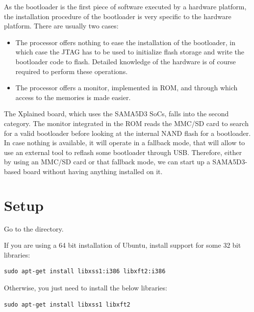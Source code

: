 
As the bootloader is the first piece of software executed by a
hardware platform, the installation procedure of the bootloader is
very specific to the hardware platform. There are usually two cases:

\begin{itemize}

\item The processor offers nothing to ease the installation of the
  bootloader, in which case the JTAG has to be used to initialize
  flash storage and write the bootloader code to flash. Detailed
  knowledge of the hardware is of course required to perform these
  operations.

\item The processor offers a monitor, implemented in ROM, and through
  which access to the memories is made easier.

\end{itemize}

The Xplained board, which uses the SAMA5D3 SoCs, falls into the second
category. The monitor integrated in the ROM reads the MMC/SD card to
search for a valid bootloader before looking at the internal NAND
flash for a bootloader. In case nothing is available, it will operate
in a fallback mode, that will allow to use an external tool
to reflash some bootloader through USB. Therefore, either by using an MMC/SD
card or that fallback mode, we can start up a SAMA5D3-based board
without having anything installed on it.

\section{Setup}

Go to the  directory.

If you are using a 64 bit installation of Ubuntu, install support for
some 32 bit libraries:

\begin{verbatim}
sudo apt-get install libxss1:i386 libxft2:i386
\end{verbatim}

Otherwise, you just need to install the below libraries:

\begin{verbatim}
sudo apt-get install libxss1 libxft2
\end{verbatim}

